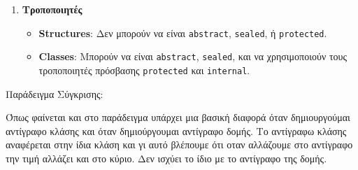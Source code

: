 \begin{enumerate}
    \item \textbf{Τροποποιητές}
    \begin{itemize}
        \item \textbf{Structures}: Δεν μπορούν να είναι \texttt{abstract}, \texttt{sealed}, ή \texttt{protected}.
        \item \textbf{Classes}: Μπορούν να είναι \texttt{abstract}, \texttt{sealed}, και να χρησιμοποιούν τους τροποποιητές πρόσβασης \texttt{protected} και \texttt{internal}.
    \end{itemize}
\end{enumerate}
 \newpage
Παράδειγμα Σύγκρισης: 



Όπως φαίνεται και στο παράδειγμα υπάρχει μια βασική διαφορά όταν δημιουργούμαι αντίγραφο κλάσης και όταν δημιούργουμαι αντίγραφο δομής. Το αντίγραφω κλάσης αναφέρεται στην ίδια κλάση και γι αυτό βλέπουμε ότι οταν αλλάζουμε στο αντίγραφο την τιμή αλλάζει και στο κύριο.
Δεν ισχύει το ίδιο με το αντίγραφο της δομής.